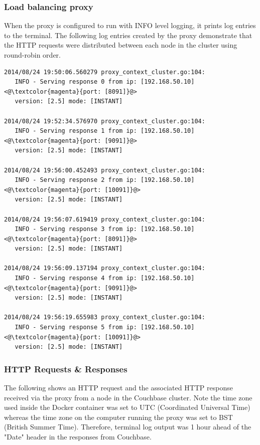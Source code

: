 \documentclass[a4paper,11pt,twoside]{report}
\begin{document}
\subsubsection*{Load balancing proxy} 
When the proxy is configured to run with INFO level logging, it prints log entries to the terminal. The following log entries created by the proxy demonstrate that the HTTP requests were distributed between each node in the cluster using round-robin order.\smallskip


\begin{lstlisting}[language=terminal]
2014/08/24 19:50:06.560279 proxy_context_cluster.go:104:     
   INFO - Serving response 0 from ip: [192.168.50.10] <@\textcolor{magenta}{port: [8091]}@> 
   version: [2.5] mode: [INSTANT]

2014/08/24 19:52:34.576970 proxy_context_cluster.go:104:     
   INFO - Serving response 1 from ip: [192.168.50.10] <@\textcolor{magenta}{port: [9091]}@> 
   version: [2.5] mode: [INSTANT]

2014/08/24 19:56:00.452493 proxy_context_cluster.go:104:     
   INFO - Serving response 2 from ip: [192.168.50.10] <@\textcolor{magenta}{port: [10091]}@> 
   version: [2.5] mode: [INSTANT]

2014/08/24 19:56:07.619419 proxy_context_cluster.go:104:     
   INFO - Serving response 3 from ip: [192.168.50.10] <@\textcolor{magenta}{port: [8091]}@> 
   version: [2.5] mode: [INSTANT]

2014/08/24 19:56:09.137194 proxy_context_cluster.go:104:     
   INFO - Serving response 4 from ip: [192.168.50.10] <@\textcolor{magenta}{port: [9091]}@> 
   version: [2.5] mode: [INSTANT]

2014/08/24 19:56:19.655983 proxy_context_cluster.go:104:     
   INFO - Serving response 5 from ip: [192.168.50.10] <@\textcolor{magenta}{port: [10091]}@> 
   version: [2.5] mode: [INSTANT]
\end{lstlisting}

\subsubsection*{HTTP Requests \& Responses} 
The following shows an HTTP request and the associated HTTP response received via the proxy from a node in the Couchbase cluster.  Note the time zone used inside the Docker container was set to UTC (Coordinated Universal Time) whereas the time zone on the computer running the proxy was set to BST (British Summer Time). Therefore, terminal log output was 1 hour ahead of the "Date" header in the responses from Couchbase.
\end{document}
